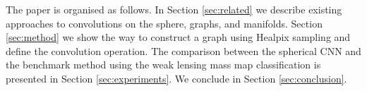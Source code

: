 \documentclass[final,twocolumn,3p,times,authoryear]{elsarticle}
\newcommand{\todo}[1]{{\color[rgb]{.6,.1,.6}{#1}}}
\newcommand{\assign}[1]{{\color[rgb]{.8,.5,.8}{Assigned: #1 }}}
\newcommand{\1}{\b{1}}              %
\newcommand{\0}{\b{0}}              %
\begin{document}
The paper is organised as follows.
In Section \ref{sec:related} we describe existing approaches to convolutions on the sphere, graphs, and manifolds.
Section \ref{sec:method} we show the way to construct a graph using Healpix sampling and define the convolution operation.
The comparison between the spherical CNN and the benchmark method using the weak lensing mass map classification is presented in Section \ref{sec:experiments}.
We conclude in Section \ref{sec:conclusion}.



\end{document}
